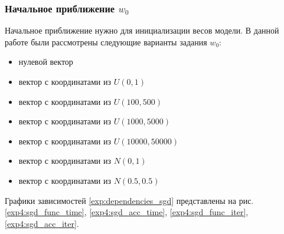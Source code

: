 \documentclass[a4paper, 11pt]{article}
\begin{document}
            \subsubsection{Начальное приближение $w_0$}
            Начальное приближение нужно для инициализации весов модели. В данной работе были рассмотрены следующие варианты задания $w_0$:
            \begin{itemize}
                \item нулевой вектор
                \item вектор с координатами из $U(0, 1)$
                \item вектор с координатами из $U(100, 500)$
                \item вектор с координатами из $U(1000, 5000)$
                \item вектор с координатами из $U(10000, 50000)$
                \item вектор с координатами из $N(0, 1)$
                \item вектор с координатами из $N(0.5, 0.5)$
            \end{itemize}
            Графики зависимостей \ref{exp:dependencies_sgd} представлены на рис. \ref{exp4:sgd_func_time}, \ref{exp4:sgd_acc_time}, \ref{exp4:sgd_func_iter}, \ref{exp4:sgd_acc_iter}.
\end{document}
